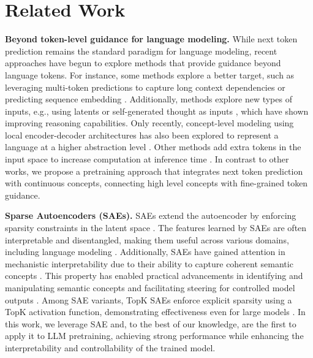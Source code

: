 \section{Related Work}
\label{sec:related}

\textbf{Beyond token-level guidance for language modeling.} While next token prediction remains the standard paradigm for language modeling, recent approaches have begun to explore methods that provide guidance beyond language tokens. For instance, some methods explore a better target, such as leveraging multi-token predictions to capture long context dependencies \citep{gloeckle2024better,liu2024deepseek} or predicting sequence embedding \citep{lee2024semiparametric}. Additionally, methods explore new types of inputs, e.g., using latents \citep{hao2024training} or self-generated thought as inputs \citep{zelikman2024quiet}, which have shown improving reasoning capabilities. Only recently, concept-level modeling using local encoder-decoder architectures has also been explored to represent a language at a higher abstraction level \citep{the2024large}. Other methods add extra tokens in the input space to increase computation at inference time \cite{nye2021show,wei2022chain,goyal2024think,lanchantin2024learning}. In contrast to other works, we propose a pretraining approach that integrates next token prediction with continuous concepts, connecting high level concepts with fine-grained token guidance. 


\textbf{Sparse Autoencoders (SAEs).} SAEs extend the autoencoder by enforcing sparsity constraints in the latent space \citep{lee2006efficient}. The features learned by SAEs are often interpretable and disentangled, making them useful across various domains, including language modeling \citep{bricken2023monosemanticity}. Additionally, SAEs have gained attention in mechanistic interpretability due to their ability to capture coherent semantic concepts \citep{marks2024sparse}. This property has enabled practical advancements in identifying and manipulating semantic concepts and facilitating steering for controlled model outputs \citep{lieberum2024gemma}. Among SAE variants, TopK SAEs \citep{makhzani2014k} enforce explicit sparsity using a TopK activation function, demonstrating effectiveness even for large models \citep{gao2024scaling}. In this work, we leverage SAE and, to the best of our knowledge, are the first to apply it to LLM pretraining, achieving strong performance while enhancing the interpretability and controllability of the trained model.

